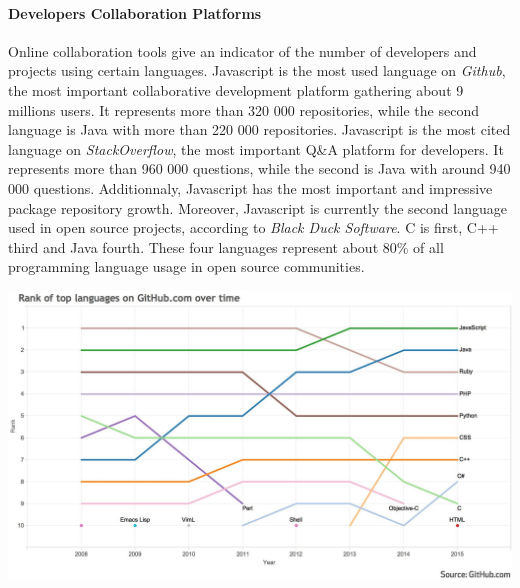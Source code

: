 
\paragraph{Developers Collaboration Platforms}

Online collaboration tools give an indicator of the number of developers and projects using certain languages.
Javascript is the most used language on \textit{Github}, the most important collaborative development platform gathering about 9 millions users.
It represents more than 320 000 repositories, while the second language is Java with more than 220 000 repositories.
Javascript is the most cited language on \textit{StackOverflow}, the most important Q\&A platform for developers.
It represents more than 960 000 questions, while the second is Java with around 940 000 questions.
Additionnaly, Javascript has the most important and impressive package repository growth.
Moreover, Javascript is currently the second language used in open source projects, according to \textit{Black Duck Software}.
C is first, C++ third and Java fourth.
These four languages represent about 80\% of all programming language usage in open source communities.

\includegraphics[width=0.9\linewidth]{../../data/js-trends/github-ranks}


